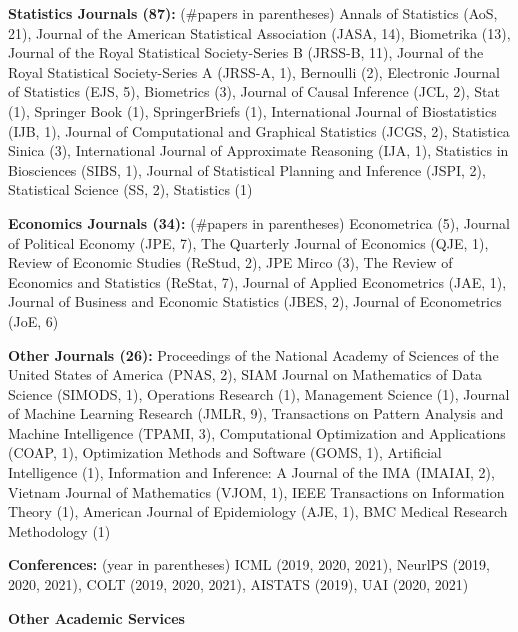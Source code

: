 \documentclass{article}
\begin{document}
\vspace{2mm}
\noindent \textbf{Statistics Journals (87): }(\#papers in parentheses) Annals of Statistics (AoS, 21), Journal of the American Statistical Association (JASA, 14), Biometrika (13), Journal of the Royal Statistical Society-Series B (JRSS-B, 11), Journal of the Royal Statistical Society-Series A (JRSS-A, 1), Bernoulli (2), Electronic Journal of Statistics (EJS, 5), Biometrics (3), Journal of Causal Inference (JCL, 2), Stat (1), Springer Book (1), SpringerBriefs (1), International Journal of Biostatistics (IJB, 1), Journal of Computational and Graphical Statistics (JCGS, 2), Statistica Sinica (3), International Journal of Approximate Reasoning (IJA, 1), Statistics in Biosciences (SIBS, 1), Journal of Statistical Planning and Inference (JSPI, 2), Statistical Science (SS, 2), Statistics (1)

\vspace{2mm}
\noindent \textbf{Economics Journals (34): }(\#papers in parentheses) Econometrica (5), Journal of Political Economy (JPE, 7), The Quarterly Journal of Economics (QJE, 1), Review of Economic Studies (ReStud, 2), JPE Mirco (3), The Review of Economics and Statistics (ReStat, 7), Journal of Applied Econometrics (JAE, 1), Journal of Business and Economic Statistics (JBES, 2), Journal of Econometrics (JoE, 6)

\vspace{2mm}
\noindent \textbf{Other Journals (26): } Proceedings of the National Academy of Sciences of the United States of America (PNAS, 2), SIAM Journal on Mathematics of Data Science (SIMODS, 1), Operations Research (1), Management Science (1), Journal of Machine Learning Research (JMLR, 9), Transactions on Pattern Analysis and Machine Intelligence (TPAMI, 3), Computational Optimization and Applications (COAP, 1), Optimization Methods and Software (GOMS, 1), Artificial Intelligence (1), Information and Inference: A Journal of the IMA (IMAIAI, 2), Vietnam Journal of Mathematics (VJOM, 1), IEEE Transactions on Information Theory (1), American Journal of Epidemiology (AJE, 1), BMC Medical Research Methodology (1)

\vspace{2mm}
\noindent \textbf{Conferences: }(year in parentheses) ICML (2019, 2020, 2021), NeurlPS (2019, 2020, 2021), COLT (2019, 2020, 2021), AISTATS (2019), UAI (2020, 2021)

\vspace{7mm}
\begin{large}
\noindent \textbf{Other Academic Services}
\end{large}
\end{document}
